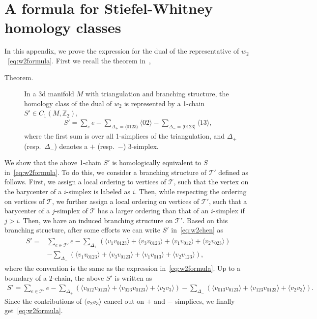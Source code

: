 \documentclass[12pt]{article}
\numberwithin{equation}{section}
\begin{document}
\section{A formula for Stiefel-Whitney homology classes}
\label{app:w2}
In this appendix, we prove the expression for the dual of the representative of $w_2$~\eqref{eq:w2formula}. First we recall the theorem in~\cite{Chen2019bosonization},
\begin{description}
\item[Theorem.] In a 3d manifold $M$ with triangulation  and branching structure, the homology class of the dual of $w_2$ is represented by a 1-chain $S'\in C_1(M, \mathbb{Z}_2)$, 
\begin{align}
    S'= \sum_{e}e-\sum_{\Delta_+=\langle0123\rangle} \langle02\rangle-\sum_{\Delta_-=\langle0123\rangle} \langle13\rangle,
    \label{eq:w2chen}
\end{align}
where the first sum is over all 1-simplices of the triangulation, and $\Delta_+$ (resp.~$\Delta_-$) denotes a $+$ (resp.~$-$) 3-simplex.
\end{description}
We show that the above 1-chain $S'$ is homologically equivalent to $S$ in~\eqref{eq:w2formula}. 
To do this, we consider a branching structure of $\mathcal{T}'$ defined as follows. 
First, we assign a local ordering to vertices of $\mathcal{T}$, such that the vertex on the barycenter of a $i$-simplex is labeled as $i$.
Then, while respecting the ordering on vertices of $\mathcal{T}$, we further assign a local ordering on vertices of $\mathcal{T}'$, such that a barycenter of a $j$-simplex of $\mathcal{T}$ has a larger ordering than that of an $i$-simplex if $j>i$. Then, we have an induced branching structure on $\mathcal{T}'$.
Based on this branching structure, after some efforts we can write $S'$ in~\eqref{eq:w2chen} as
\begin{align}
\begin{split}
    S'=&\sum_{e\in\mathcal{T}'}e-\sum_{\Delta_+}(\langle v_1v_{0123}\rangle+\langle v_3v_{0123}\rangle+\langle v_1v_{012}\rangle+\langle v_2v_{023}\rangle)
    \\
    &-\sum_{\Delta_-}(\langle v_1v_{0123}\rangle+\langle v_3v_{0123}\rangle+\langle v_1v_{013}\rangle+\langle v_2v_{123}\rangle),
\end{split}
\end{align}
where the convention is the same as the expression in~\eqref{eq:w2formula}.
Up to a boundary of a 2-chain, the above $S'$ is written as
\begin{align}
    S'=\sum_{e\in\mathcal{T}'}e-\sum_{\Delta_+}(\langle v_{012}v_{0123}\rangle+\langle v_{023}v_{0123}\rangle+\langle v_2v_3\rangle)-\sum_{\Delta_-}(\langle v_{013}v_{0123}\rangle+\langle v_{123}v_{0123}\rangle+\langle v_2v_3\rangle).
\end{align}
Since the contributions of $\langle v_2v_3\rangle$ cancel out on $+$ and $-$ simplices, we finally get~\eqref{eq:w2formula}.
\end{document}
